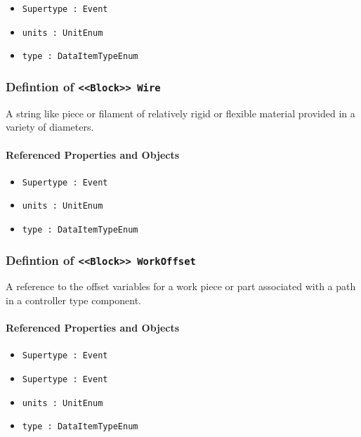 \begin{itemize}
\item \texttt{Supertype : Event}

\item \texttt{units : UnitEnum}

\item \texttt{type : DataItemTypeEnum}

\end{itemize}
\FloatBarrier
\subsubsection{Defintion of \texttt{<<Block>> Wire}}
  \label{type:Wire}

\FloatBarrier

A string like piece or filament of relatively rigid or flexible material provided in a variety of diameters.

\FloatBarrier
\paragraph{Referenced Properties and Objects}

\begin{itemize}
\item \texttt{Supertype : Event}

\item \texttt{units : UnitEnum}

\item \texttt{type : DataItemTypeEnum}

\end{itemize}
\FloatBarrier
\subsubsection{Defintion of \texttt{<<Block>> WorkOffset}}
  \label{type:WorkOffset}

\FloatBarrier

A reference to the offset variables for a work piece or part associated with a path in a controller type component.

\FloatBarrier
\paragraph{Referenced Properties and Objects}

\begin{itemize}
\item \texttt{Supertype : Event}

\item \texttt{Supertype : Event}

\item \texttt{units : UnitEnum}

\item \texttt{type : DataItemTypeEnum}

\end{itemize}
\FloatBarrier
